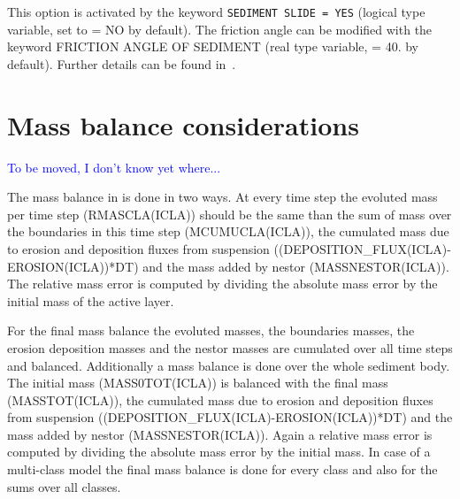 This option is activated by the keyword \texttt{SEDIMENT SLIDE = YES} (logical type variable, set to {\ttfamily = NO} by default). The friction angle can be modified with the keyword {\ttfamily FRICTION ANGLE OF SEDIMENT} (real type variable, {\ttfamily = 40.} by default). Further details can be found in~\cite{ElKadiAbderrezzak201675}.

\section{Mass balance considerations}
\textcolor{blue}{To be moved, I don't know yet where...}

The mass balance in \gaia{} is done in two ways. At every time step the evoluted mass per time step ({\ttfamily RMASCLA(ICLA)}) should be the same than the sum of mass over the boundaries in this time step ({\ttfamily MCUMUCLA(ICLA)}), the cumulated mass due to erosion and deposition fluxes from suspension
({\ttfamily (DEPOSITION\_FLUX(ICLA)-EROSION(ICLA))*DT}) and the mass added by nestor ({\ttfamily MASSNESTOR(ICLA)}). The relative mass error is computed by dividing the absolute mass error by the initial mass of the active layer.

For the final mass balance the evoluted masses, the boundaries masses, the erosion deposition masses and the nestor masses are cumulated over all time steps and balanced. Additionally a mass balance is done over the whole sediment body. The initial mass ({\ttfamily MASS0TOT(ICLA)}) is balanced with the final mass ({\ttfamily MASSTOT(ICLA)}), the cumulated mass due to erosion and deposition fluxes from suspension
({\ttfamily (DEPOSITION\_FLUX(ICLA)-EROSION(ICLA))*DT}) and the mass added by nestor ({\ttfamily MASSNESTOR(ICLA)}). Again a relative mass error is computed by dividing the absolute mass error by the initial mass.
In case of a multi-class model the final mass balance is done for every class and also for the sums over all classes.
